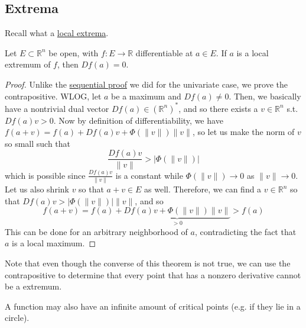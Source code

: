 \subsection{Extrema}

	Recall what a \hyperref[pst-def:local_extrema]{local extrema}. 
	
  \begin{theorem} 
		\label{thm:fermat_interior_extremum}
		Let $E \subset \mathbb{R}^n$ be open, with $f: E \to \mathbb{R}$ differentiable at $a \in E$. If $a$ is a local extremum of $f$, then $Df(a) = 0$. 
  \end{theorem}
	\begin{proof}
		Unlike the \hyperref[real-thm:fermat_interior_extremum]{sequential proof} we did for the univariate case, we prove the contrapositive. WLOG, let $a$ be a maximum and $Df(a) \neq 0$. Then, we basically have a nontrivial dual vector $Df(a) \in (\mathbb{R}^n)^\ast$, and so there exists a $v \in \mathbb{R}^n$ s.t. $Df(a) v > 0$. Now by definition of differentiability, we have $f(a + v) = f(a) + Df(a) v + \Phi(\|v\|) \|v\|$, so let us make the norm of $v$ so small such that 
		\begin{equation}
			\frac{Df(a) v}{\|v\|} > | \Phi(\|v\|) |
		\end{equation}
		which is possible since $\frac{Df(a) v}{\|v\|}$ is a constant while $\Phi(\|v\|) \to 0$ as $\|v\| \to 0$. Let us also shrink $v$ so that $a + v \in E$ as well. Therefore, we can find a $v \in \mathbb{R}^n$ so that $Df(a) v > | \Phi(\|v\|)| \|v\|$, and so 
		\begin{equation}
			f(a + v) = f(a) + \underbrace{Df(a) v + \Phi(\|v\|) \|v\|}_{> 0} > f(a)
		\end{equation}
		This can be done for an arbitrary neighborhood of $a$, contradicting the fact that $a$ is a local maximum. 
	\end{proof}

  Note that even though the converse of this theorem is not true, we can use the contrapositive to determine that every point that has a nonzero derivative cannot be a extremum. 

	\begin{example}
	  \label{ex:function-with-an-infinite-number-of-critical}
		A function may also have an infinite amount of critical points (e.g. if they lie in a circle). 
	\end{example}

